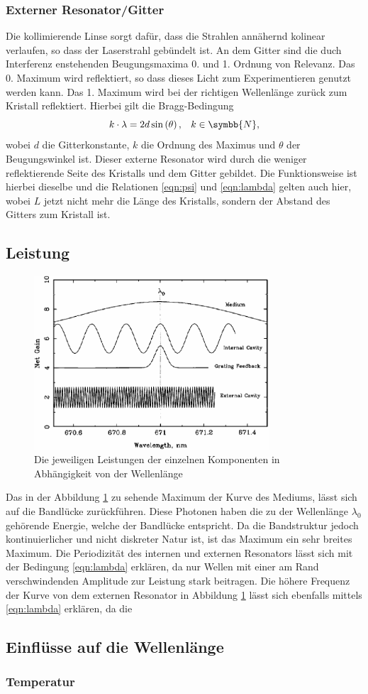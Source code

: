 \subsubsection{Externer Resonator/Gitter}
\label{subsubsec:externeResonator}
Die kollimierende Linse sorgt dafür, dass die Strahlen annähernd kolinear verlaufen, so dass der Laserstrahl gebündelt ist.
An dem Gitter sind die duch Interferenz enstehenden Beugungsmaxima 0. und 1. Ordnung von Relevanz.
Das 0. Maximum wird reflektiert, so dass dieses Licht zum Experimentieren genutzt werden kann. Das 1. Maximum wird bei der richtigen Wellenlänge zurück zum Kristall reflektiert.
Hierbei gilt die Bragg-Bedingung
\begin{equation}
   k \cdot \lambda = 2d \sin \left (  \theta \right ) , \; \; \; k \in \symbb{N} \label{eqn:bragg} ,
\end{equation}
wobei $d$ die Gitterkonstante, $k$ die Ordnung des Maximus und $\theta$ der Beugungswinkel ist.
Dieser externe Resonator wird durch die weniger reflektierende Seite des Kristalls und dem Gitter gebildet.
Die Funktionsweise ist hierbei dieselbe und die Relationen \ref{eqn:psi} und \ref{eqn:lambda} gelten auch hier, wobei $L$ jetzt nicht mehr die Länge des Kristalls, sondern 
der Abstand des Gitters zum Kristall ist.
\subsection{Leistung}
\begin{figure}
    \centering
    \includegraphics[width = 0.78\textwidth]{pictures/gain.png}
    \caption{Die jeweiligen Leistungen der einzelnen Komponenten in Abhängigkeit von der Wellenlänge\cite{theorie}}
    \label{pic:gain}
\end{figure}
Das in der Abbildung \ref{pic:gain} zu sehende Maximum der Kurve des Mediums, lässt sich auf die Bandlücke zurückführen. 
Diese Photonen haben die zu der Wellenlänge $\lambda_0$ gehörende Energie, welche der Bandlücke entspricht. 
Da die Bandstruktur jedoch kontinuierlicher und nicht diskreter Natur ist, ist das Maximum ein sehr breites Maximum.
Die Periodizität des internen und externen Resonators lässt sich mit der Bedingung \ref{eqn:lambda} erklären, da nur Wellen mit einer am Rand verschwindenden Amplitude zur Leistung stark beitragen.
Die höhere Frequenz der Kurve von dem externen Resonator in Abbildung \ref{pic:gain} lässt sich ebenfalls mittels \ref{eqn:lambda} erklären, da die 
 
\subsection{Einflüsse auf die Wellenlänge}
\subsubsection{Temperatur}